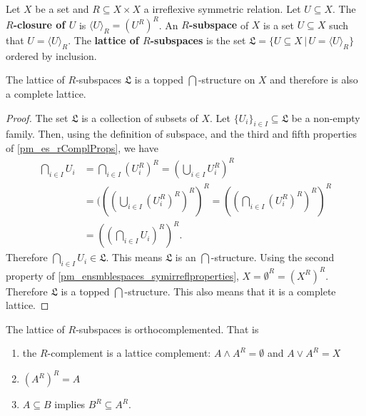 \begin{mathSection}
	\begin{defn}
		Let $X$ be a set and $R \subseteq X \times X$ a irreflexive symmetric relation. Let $U \subseteq X$. The \textbf{$R$-closure of $U$} is $\langle U \rangle_R = (U^{R})^{R}$. An \textbf{$R$-subspace} of $X$ is a set $U \subseteq X$ such that $U = \langle U \rangle_R$. The \textbf{lattice of $R$-subspaces} is the set $\mathfrak{L} = \{ U \subseteq X \, | \, U = \langle U \rangle_R \}$ ordered by inclusion.
	\end{defn}
	
	\begin{coro}
		The lattice of $R$-subspaces $\mathfrak{L}$ is a topped $\bigcap$-structure on $X$ and therefore is also a complete lattice.
	\end{coro}
	\begin{proof}
		The set $\mathfrak{L}$ is a collection of subsets of $X$. Let $\{U_i\}_{i \in I} \subseteq \mathfrak{L}$ be a non-empty family. Then, using the definition of subspace, and the third and fifth properties of \ref{pm_es_rComplProps}, we have
		\begin{align*}
			\bigcap_{i \in I} U_i &= \bigcap_{i \in I} (U_i^{R})^{R} = (\bigcup_{i \in I} U_i^{R})^{R} \\
			&= (((\bigcup_{i \in I} (U_i^{R})^{R})^{R})^{R} = ((\bigcap_{i \in I} (U_i^{R})^{R})^{R})^{R} \\
			&= ((\bigcap_{i \in I} U_i)^{R})^{R}.
		\end{align*}
		Therefore $\bigcap_{i \in I} U_i \in \mathfrak{L}$. This means $\mathfrak{L}$ is an $\bigcap$-structure. Using the second property of \ref{pm_ensmblespaces_symirreflproperties}, $X = \emptyset^{R} = (X^{R})^{R}$. Therefore $\mathfrak{L}$ is a topped $\bigcap$-structure. This also means that it is a complete lattice.
	\end{proof}
	
	\begin{prop}
		The lattice of $R$-subspaces is orthocomplemented. That is
		\begin{enumerate}
			\item the $R$-complement is a lattice complement: $A \wedge A^{R} = \emptyset$ and $A \vee A^{R} = X$
			\item $(A^{R})^{R} = A$
			\item $A \subseteq B$ implies $B^{R} \subseteq A^{R}$.
		\end{enumerate}
	\end{prop}
	

\end{mathSection}

